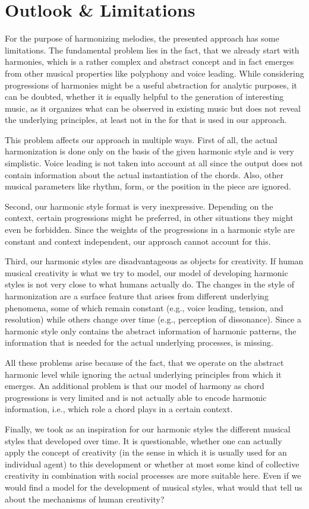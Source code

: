 \section{Outlook \& Limitations}

For the purpose of harmonizing melodies, the presented approach has some limitations.
The fundamental problem lies in the fact, that we already start with harmonies, which is a rather complex and abstract concept and in fact emerges from other musical properties like polyphony and voice leading.
While considering progressions of harmonies might be a useful abstraction for analytic purposes, it can be doubted, whether it is equally helpful to the generation of interesting music, as it organizes what can be observed in existing music but does not reveal the underlying principles, at least not in the for that is used in our approach.

This problem affects our approach in multiple ways.
First of all, the actual harmonization is done only on the basis of the given harmonic style and is very simplistic.
Voice leading is not taken into account at all since the output does not contain information about the actual instantiation of the chords.
Also, other musical parameters like rhythm, form, or the position in the piece are ignored.

Second, our harmonic style format is very inexpressive.
Depending on the context, certain progressions might be preferred, in other situations they might even be forbidden.
Since the weights of the progressions in a harmonic style are constant and context independent, our approach cannot account for this.

Third, our harmonic styles are disadvantageous as objects for creativity.
If human musical creativity is what we try to model, our model of developing harmonic styles is not very close to what humans actually do.
The changes in the style of harmonization are a surface feature that arises from different underlying phenomena, some of which remain constant (e.g., voice leading, tension, and resolution) while others change over time (e.g., perception of dissonance).
Since a harmonic style only contains the abstract information of harmonic patterns, the information that is needed for the actual underlying processes, is missing.

All these problems arise because of the fact, that we operate on the abstract harmonic level while ignoring the actual underlying principles from which it emerges.
An additional problem is that our model of harmony as chord progressions is very limited and is not actually able to encode harmonic information, i.e., which role a chord plays in a certain context.

Finally, we took as an inspiration for our harmonic styles the different musical styles that developed over time.
It is questionable, whether one can actually apply the concept of creativity (in the sense in which it is usually used for an individual agent) to this development or whether at most some kind of collective creativity in combination with social processes are more suitable here.
Even if we would find a model for the development of musical styles, what would that tell us about the mechanisms of human creativity?